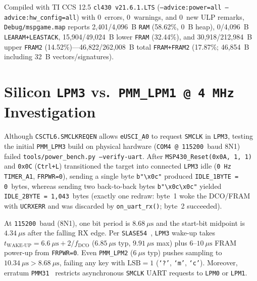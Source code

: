 \documentclass[conference]{IEEEtran}
\begin{document}
Compiled with TI CCS 12.5 \texttt{cl430 v21.6.1.LTS} (\texttt{--advice:power=all --advice:hw\_config=all}) with 0~errors, 0~warnings, and 0~new ULP remarks, \texttt{Debug/mspgame.map} reports 2,401/4,096~B \texttt{RAM} (58.62\%, 0~B heap), 0/4,096~B \texttt{LEARAM+LEASTACK}, 15,904/49,024~B lower \texttt{FRAM} (32.44\%), and 30,918/212,984~B upper \texttt{FRAM2} (14.52\%)—46,822/262,008~B total \texttt{FRAM+FRAM2} (17.87\%; 46,854~B including 32~B vectors/signatures).

\section{Silicon \texttt{LPM3} vs.\ \texttt{PMM\_LPM1 @ 4 MHz} Investigation}

Although \texttt{CSCTL6.SMCLKREQEN} allows \texttt{eUSCI\_A0} to request \texttt{SMCLK} in \texttt{LPM3}, testing the initial \texttt{PMM\_LPM3} build on physical hardware (\texttt{COM4 @ 115200}~baud 8N1) failed \texttt{tools/power\_bench.py --verify-uart}. After \texttt{MSP430\_Reset(0x0A, 1, 1)} and \texttt{0x0C} (\texttt{Ctrl+L}) transitioned the target into connected \texttt{LPM3} idle (\texttt{0~Hz} \texttt{TIMER\_A1}, \texttt{FRPWR=0}), sending a single byte \texttt{b"\textbackslash x0c"} produced \texttt{IDLE\_1BYTE = 0}~bytes, whereas sending two back-to-back bytes \texttt{b"\textbackslash x0c\textbackslash x0c"} yielded \texttt{IDLE\_2BYTE = 1,043}~bytes (exactly one redraw: byte~1 woke the DCO/FRAM with \texttt{UCRXERR} and was discarded by \texttt{on\_uart\_rx()}; byte~2 succeeded).

At \texttt{115200}~baud (8N1), one bit period is $8.68~\mu\text{s}$ and the start-bit midpoint is \textbf{$4.34~\mu\text{s}$} after the falling RX edge. Per \texttt{SLASE54}~\cite{ti_ds}, \texttt{LPM3} wake-up takes $t_{\text{WAKE-UP}} = 6.6~\mu\text{s} + 2/f_{\text{DCO}}$ ($6.85~\mu\text{s}$ typ, $9.91~\mu\text{s}$ max) plus $6$--$10~\mu\text{s}$ FRAM power-up from \texttt{FRPWR=0}. Even \texttt{PMM\_LPM2} ($6~\mu\text{s}$ typ) pushes sampling to $10.34~\mu\text{s} > 8.68~\mu\text{s}$, failing any key with $\text{LSB}=1$ (\texttt{`?'}, \texttt{`m'}, \texttt{`c'}). Moreover, erratum \texttt{PMM31}~\cite{ti_errata} restricts asynchronous \texttt{SMCLK} UART requests to \texttt{LPM0} or \texttt{LPM1}.
\end{document}
